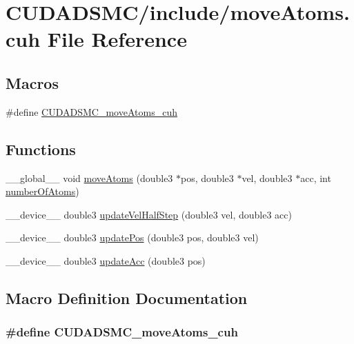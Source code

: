 \hypertarget{move_atoms_8cuh}{\section{C\+U\+D\+A\+D\+S\+M\+C/include/move\+Atoms.cuh File Reference}
\label{move_atoms_8cuh}
}
\subsection*{Macros}
\begin{DoxyCompactItemize}
\item 
\#define \hyperlink{move_atoms_8cuh_acf80001aea534ff15d0291d702ac0676}{C\+U\+D\+A\+D\+S\+M\+C\+\_\+move\+Atoms\+\_\+cuh}
\end{DoxyCompactItemize}
\subsection*{Functions}
\begin{DoxyCompactItemize}
\item 
\+\_\+\+\_\+global\+\_\+\+\_\+ void \hyperlink{move_atoms_8cuh_ad773cb3a8b3c26ec2feadda563a7d272}{move\+Atoms} (double3 $\ast$pos, double3 $\ast$vel, double3 $\ast$acc, int \hyperlink{initial_system_parameters_8cuh_a5ce690e43012981ef3034cbf0c746489}{number\+Of\+Atoms})
\item 
\+\_\+\+\_\+device\+\_\+\+\_\+ double3 \hyperlink{move_atoms_8cuh_aebf2f5bae0865bdce93e42043725a589}{update\+Vel\+Half\+Step} (double3 vel, double3 acc)
\item 
\+\_\+\+\_\+device\+\_\+\+\_\+ double3 \hyperlink{move_atoms_8cuh_a6fc01de03412c50d8220d2c617847179}{update\+Pos} (double3 pos, double3 vel)
\item 
\+\_\+\+\_\+device\+\_\+\+\_\+ double3 \hyperlink{move_atoms_8cuh_aab55560bb96302129a94cfa7584b2256}{update\+Acc} (double3 pos)
\end{DoxyCompactItemize}


\subsection{Macro Definition Documentation}
\hypertarget{move_atoms_8cuh_acf80001aea534ff15d0291d702ac0676}{
\subsubsection[{C\+U\+D\+A\+D\+S\+M\+C\+\_\+move\+Atoms\+\_\+cuh}]{\setlength{\rightskip}{0pt plus 5cm}\#define C\+U\+D\+A\+D\+S\+M\+C\+\_\+move\+Atoms\+\_\+cuh}}\label{move_atoms_8cuh_acf80001aea534ff15d0291d702ac0676}


